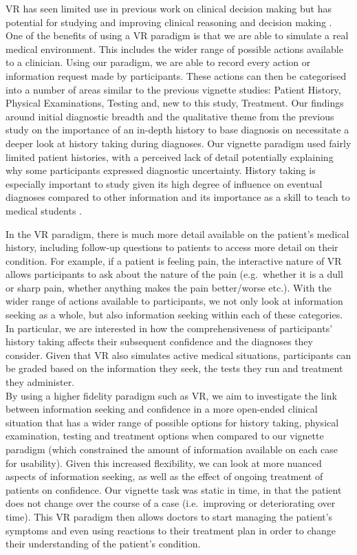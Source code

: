 \documentclass[a4paper, nobind]{templates/ociamthesis}
\begin{document}
\hfill\break
VR has seen limited use in previous work on clinical decision making but has potential for studying and improving clinical reasoning and decision making \autocite{jans_examining_2023}. One of the benefits of using a VR paradigm is that we are able to simulate a real medical environment. This includes the wider range of possible actions available to a clinician. Using our paradigm, we are able to record every action or information request made by participants. These actions can then be categorised into a number of areas similar to the previous vignette studies: Patient History, Physical Examinations, Testing and, new to this study, Treatment. Our findings around initial diagnostic breadth and the qualitative theme from the previous study on the importance of an in-depth history to base diagnosis on necessitate a deeper look at history taking during diagnoses. Our vignette paradigm used fairly limited patient histories, with a perceived lack of detail potentially explaining why some participants expressed diagnostic uncertainty. History taking is especially important to study given its high degree of influence on eventual diagnoses compared to other information \autocite{hampton_relative_1975,sandler_importance_1980,peterson_contributions_1992} and its importance as a skill to teach to medical students \autocite{keifenheim_teaching_2015}.

\hfill\break
In the VR paradigm, there is much more detail available on the patient's medical history, including follow-up questions to patients to access more detail on their condition. For example, if a patient is feeling pain, the interactive nature of VR allows participants to ask about the nature of the pain (e.g.~whether it is a dull or sharp pain, whether anything makes the pain better/worse etc.). With the wider range of actions available to participants, we not only look at information seeking as a whole, but also information seeking within each of these categories. In particular, we are interested in how the comprehensiveness of participants' history taking affects their subsequent confidence and the diagnoses they consider. Given that VR also simulates active medical situations, participants can be graded based on the information they seek, the tests they run and treatment they administer.\\

By using a higher fidelity paradigm such as VR, we aim to investigate the link between information seeking and confidence in a more open-ended clinical situation that has a wider range of possible options for history taking, physical examination, testing and treatment options when compared to our vignette paradigm (which constrained the amount of information available on each case for usability). Given this increased flexibility, we can look at more nuanced aspects of information seeking, as well as the effect of ongoing treatment of patients on confidence. Our vignette task was static in time, in that the patient does not change over the course of a case (i.e.~improving or deteriorating over time). This VR paradigm then allows doctors to start managing the patient's symptoms and even using reactions to their treatment plan in order to change their understanding of the patient's condition.
\end{document}

